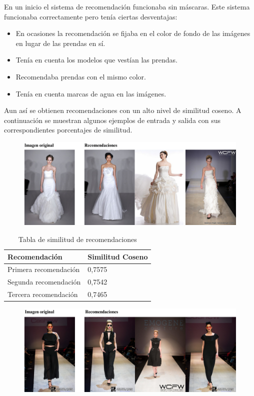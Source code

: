 \documentclass[12pt]{report} %
\begin{document}
	En un inicio el sistema de recomendación funcionaba sin máscaras. Este sistema funcionaba correctamente pero
	tenía ciertas desventajas:
	\begin{itemize}
		\item En ocasiones la recomendación se fijaba en el color de fondo de las imágenes en lugar de las prendas en sí.
		\item Tenía en cuenta los modelos que vestían las prendas.
		\item Recomendaba prendas con el mismo color.
		\item Tenía en cuenta marcas de agua en las imágenes.
	\end{itemize}
	Aun así se obtienen recomendaciones con un alto nivel de similitud coseno. A continuación se muestran algunos ejemplos
	de entrada y salida con sus correspondientes porcentajes de similitud.
	\begin{figure}[H]
		{\includegraphics[scale=0.6]{recomendacion1.png}}
	\end{figure}
	\begin{table}[H]
		\centering
		\caption{Tabla de similitud de recomendaciones}
		\begin{tabular}{ll}
				\textbf{Recomendación} & \textbf{Similitud Coseno} \\
				\midrule
				Primera recomendación & 0,7575 \\
				Segunda recomendación & 0,7542 \\
				Tercera recomendación & 0,7465 \\
				\bottomrule
		\end{tabular}
	\end{table}
	\begin{figure}[H]
		{\includegraphics[scale=0.6]{recomendacion2.png}}
	\end{figure}
\end{document}

